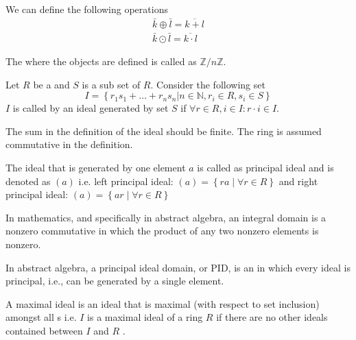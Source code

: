\begin{appendices}
\begin{example}
  We can define the following operations
  \begin{eqnarray}
    \bar{k} \oplus \bar{l} = \overline{k + l}
    \nonumber \\
    \bar{k} \odot \bar{l} = \overline{k \cdot l}
    \nonumber
  \end{eqnarray}
  
  The  where the objects are defined is called as
  $\mathbb{Z}/n\mathbb{Z}$.
  \label{ex:intmodulo}
\end{example}

\begin{definition}
  Let $R$ be a  and $S$ is a sub set of $R$.
  Consider the following set
  \[
  I = \left\{
  r_1 s_1 + \dots + r_n s_n \vert n \in \mathbb{N}, r_i \in R, s_i \in S
  \right\}
  \]
  $I$ is called by an ideal generated by set $S$ if
  $\forall r \in R, i \in I: r \cdot i \in I$.

  The sum in the definition of the ideal should be finite. The ring is
  assumed commutative in the definition.
  \label{def:idealset}
\end{definition}

\begin{definition}
  The ideal that is generated by one element $a$ is called as
  principal ideal and is denoted as $\left(a\right)$ i.e.
  left principal ideal:
  $\left(a\right) = \left\{r a \mid \forall r \in R\right\}$ and
  right principal ideal:
  $\left(a\right) = \left\{a r \mid \forall r \in R\right\}$
  \label{def:prinicipalideal}
\end{definition}

\begin{definition}
In mathematics, and specifically in abstract algebra, an integral
domain is a nonzero commutative  in which the
product of any two nonzero elements is nonzero.
\label{def:integraldomain}
\end{definition}

\begin{definition}
  In abstract algebra, a principal ideal domain, or PID, is an
   in which every ideal is principal, i.e., can be
  generated by a single element.
  \label{def:pid}
\end{definition}

\begin{definition}
  A maximal ideal is an ideal that is maximal (with respect to set
  inclusion) amongst all s i.e.
  $I$ is a maximal ideal of a ring $R$ if there are no other ideals
  contained between $I$ and $R$ \cite{wiki:maxideal}.
\label{def:maxideal}
\end{definition}


\end{appendices}
